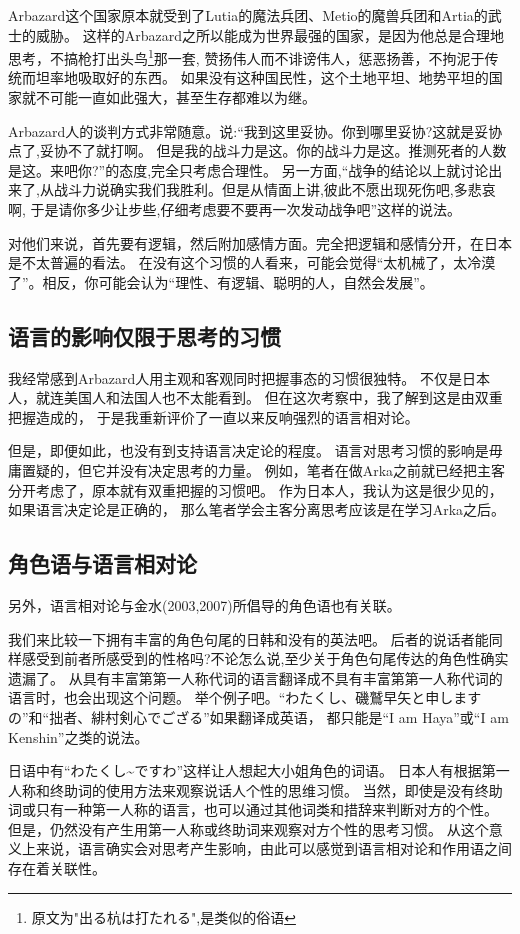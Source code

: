Arbazard这个国家原本就受到了Lutia的魔法兵团、Metio的魔兽兵团和Artia的武士的威胁。
这样的Arbazard之所以能成为世界最强的国家，是因为他总是合理地思考，不搞枪打出头鸟\footnote{原文为"出る杭は打たれる",是类似的俗语}那一套,
赞扬伟人而不诽谤伟人，惩恶扬善，不拘泥于传统而坦率地吸取好的东西。
如果没有这种国民性，这个土地平坦、地势平坦的国家就不可能一直如此强大，甚至生存都难以为继。

Arbazard人的谈判方式非常随意。说:“我到这里妥协。你到哪里妥协?这就是妥协点了,妥协不了就打啊。
但是我的战斗力是这。你的战斗力是这。推测死者的人数是这。来吧你?”的态度,完全只考虑合理性。
另一方面,“战争的结论以上就讨论出来了,从战斗力说确实我们我胜利。但是从情面上讲,彼此不愿出现死伤吧,多悲哀啊,
于是请你多少让步些,仔细考虑要不要再一次发动战争吧”这样的说法。

对他们来说，首先要有逻辑，然后附加感情方面。完全把逻辑和感情分开，在日本是不太普遍的看法。
在没有这个习惯的人看来，可能会觉得“太机械了，太冷漠了”。相反，你可能会认为“理性、有逻辑、聪明的人，自然会发展”。
\subsection{语言的影响仅限于思考的习惯}
我经常感到Arbazard人用主观和客观同时把握事态的习惯很独特。
不仅是日本人，就连美国人和法国人也不太能看到。
但在这次考察中，我了解到这是由双重把握造成的，
于是我重新评价了一直以来反响强烈的语言相对论。

但是，即便如此，也没有到支持语言决定论的程度。
语言对思考习惯的影响是毋庸置疑的，但它并没有决定思考的力量。
例如，笔者在做Arka之前就已经把主客分开考虑了，原本就有双重把握的习惯吧。
作为日本人，我认为这是很少见的，如果语言决定论是正确的，
那么笔者学会主客分离思考应该是在学习Arka之后。

\subsection{角色语与语言相对论}
另外，语言相对论与金水(2003,2007)所倡导的角色语也有关联。

我们来比较一下拥有丰富的角色句尾的日韩和没有的英法吧。
后者的说话者能同样感受到前者所感受到的性格吗?不论怎么说,至少关于角色句尾传达的角色性确实遗漏了。
从具有丰富第第一人称代词的语言翻译成不具有丰富第第一人称代词的语言时，也会出现这个问题。
举个例子吧。“わたくし、磯鷲早矢と申しますの”和“拙者、緋村剣心でござる”如果翻译成英语，
都只能是“I am Haya”或“I am Kenshin”之类的说法。

日语中有“わたくし\~{}ですわ”这样让人想起大小姐角色的词语。
日本人有根据第一人称和终助词的使用方法来观察说话人个性的思维习惯。
当然，即使是没有终助词或只有一种第一人称的语言，也可以通过其他词类和措辞来判断对方的个性。
但是，仍然没有产生用第一人称或终助词来观察对方个性的思考习惯。
从这个意义上来说，语言确实会对思考产生影响，由此可以感觉到语言相对论和作用语之间存在着关联性。

